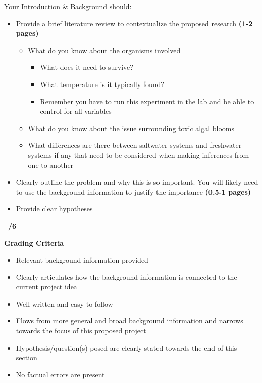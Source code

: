 \documentclass[
]{book}
\providecommand{\tightlist}{%
  \setlength{\itemsep}{0pt}\setlength{\parskip}{0pt}}
\begin{document}
Your Introduction \& Background should:

\begin{itemize}
\tightlist
\item
  Provide a brief literature review to contextualize the proposed research \textbf{(1-2 pages)}

  \begin{itemize}
  \tightlist
  \item
    What do you know about the organisms involved

    \begin{itemize}
    \tightlist
    \item
      What does it need to survive?
    \item
      What temperature is it typically found?
    \item
      Remember you have to run this experiment in the lab and be able to control for all variables
    \end{itemize}
  \item
    What do you know about the issue surrounding toxic algal blooms
  \item
    What differences are there between saltwater systems and freshwater systems if any that need to be considered when making inferences from one to another
  \end{itemize}
\item
  Clearly outline the problem and why this is so important. You will likely need to use the background information to justify the importance \textbf{(0.5-1 pages)}
\item
  Provide clear hypotheses
\end{itemize}

\textbf{~/6}

\textbf{Grading Criteria}

\begin{itemize}
\tightlist
\item
  Relevant background information provided
\item
  Clearly articulates how the background information is connected to the current project idea
\item
  Well written and easy to follow
\item
  Flows from more general and broad background information and narrows towards the focus of this proposed project
\item
  Hypothesis/question(s) posed are clearly stated towards the end of this section
\item
  No factual errors are present
\end{itemize}
\end{document}

